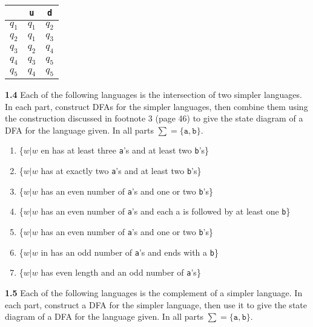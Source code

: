 \documentclass{article}
\begin{document}
\begin{center}
\begin{tabular}{c|cc}
            &   \texttt{u}     &   \texttt{d} \\
    \hline
    $q_1$   &   $q_1$   &   $q_2$   \\
    $q_2$   &   $q_1$   &   $q_3$   \\
    $q_3$   &   $q_2$   &   $q_4$   \\
    $q_4$   &   $q_3$   &   $q_5$   \\
    $q_5$   &   $q_4$   &   $q_5$
\end{tabular}
\end{center}


\textbf{1.4} Each of the following languages is the intersection of two simpler
languages. In each part, construct DFAs for the simpler languages, then combine
them using the construction discussed in footnote 3 (page 46) to give the state
diagram of a DFA for the language given. In all parts $\sum = \{\texttt{a},
\texttt{b}\}$.

    \begin{enumerate}
        \item \{$w|w$ en has at least three \texttt{a}'s and at least two \texttt{b}'s\}
        \item \{$w|w$ has at exactly two \texttt{a}'s and at least two \texttt{b}'s\}
        \item \{$w|w$ has an even number of \texttt{a}'s and one or two \texttt{b}'s\}
        \item \{$w|w$ has an even number of \texttt{a}'s and each a is followed by at least one \texttt{b}\}
        \item \{$w|w$ has an even number of \texttt{a}'s and one or two \texttt{b}'s\}
        \item \{$w|w$ in has an odd number of \texttt{a}'s and ends with a \texttt{b}\}
        \item \{$w|w$ has even length and an odd number of \texttt{a}'s\}
    \end{enumerate}

\textbf{1.5} Each of the following languages is the complement of a simpler
language. In each part, construct a DFA for the simpler language, then use it to
give the state diagram of a DFA for the language given. In all parts $\sum =
\{\texttt{a}, \texttt{b}\}$.
\end{document}
